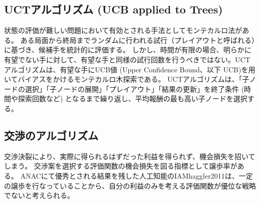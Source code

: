 \documentclass[a4, 10pt,dvipdfmx,twocolumn]{jsarticle}
\begin{document}
\subsection{UCTアルゴリズム (UCB applied to Trees)}
状態の評価が難しい問題において有効とされる手法としてモンテカルロ法がある。
ある局面から終局までランダムに行われる試行（プレイアウトと呼ばれる）に基づき、候補手を統計的に評価する。
しかし、時間が有限の場合、明らかに有望でない手に対して、有望な手と同様の試行回数を行うべきではない。UCTアルゴリズムは、有望な手にUCB値 (Upper Confidence Bound、以下 UCB)\cite{kocsis2006bandit}を用いてバイアスをかけるモンテカルロ木探索である。
UCTアルゴリズムは、「子ノードの選択」「子ノードの展開」「プレイアウト」「結果の更新」を終了条件 (時間や探索回数など) となるまで繰り返し、平均報酬の最も高い子ノードを選択する。

\subsection{交渉のアルゴリズム}
交渉決裂により、実際に得られるはずだった利益を得られず、機会損失を招いてしまう。
交渉案を選択する評価関数の機会損失を図る指標として譲歩率がある\cite{baarslag2012evaluating}。
ANACにて優秀とされる結果を残した人工知能のIAMhaggler2011\cite{baarslag2012evaluating}は、一定の譲歩を行なっていることから、自分の利益のみを考える評価関数が優位な戦略でないと考えられる。


\end{document}
